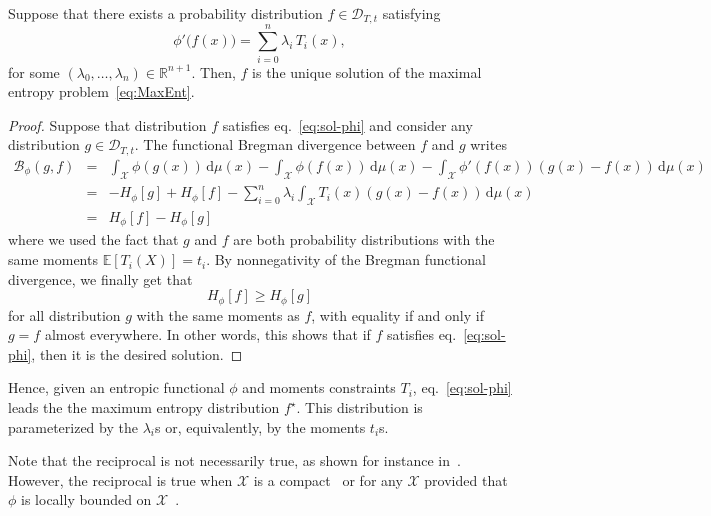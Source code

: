 \documentclass[entropy,article,submit,moreauthors,pdftex]{Definitions/mdpi}
\def\dmu{\mathrm{d}\mu}%
\def\fB{\mathcal{B}}%
\def\Rset{\mathbb{R}}%
\def\X{\mathcal{X}}%
\def\D{\mathcal{D}}%
\newcommand{\Esp}[1]{\mathbb{E}\left[ #1 \right]}%
\begin{document}
\begin{Proposition}
\label{prop:sol-phi}
%
  Suppose  that  there  exists  a  probability  distribution  $f  \in  \D_{T,t}$
  satisfying
  \begin{equation}\label{eq:sol-phi}
  \phi'\big(f(x)\big) = \sum_{i=0}^n \lambda_i \, T_i(x),
  \end{equation}
  for  some $(\lambda_0,\ldots,\lambda_n)  \in \Rset^{n+1}$.   Then, $f$  is the
  unique solution of the maximal entropy problem~\eqref{eq:MaxEnt}.
\end{Proposition}
%
\begin{proof}
  Suppose that  distribution $f$  satisfies eq.~\eqref{eq:sol-phi}  and consider
  any distribution $g \in \D_{T,t}$.   The functional Bregman divergence between
  $f$ and $g$ writes
  \begin{eqnarray*}
  \fB_\phi(g,f) & = & \int_\X \phi(g(x)) \, \dmu(x) - \int_\X \phi(f(x)) \,
  \dmu(x) - \int_\X \phi'(f(x)) \left( g(x) - f(x) \right) \, \dmu(x)
  \\[2mm]
  & = & - H_\phi[g] + H_\phi[f] - \sum_{i=0}^n \lambda_i \int_\X T_i(x) \left(
  g(x) - f(x) \right) \, \dmu(x)
  \\[2mm]
  & = & H_\phi[f] - H_\phi[g]
  \end{eqnarray*}
  where we  used the fact  that $g$ and  $f$ are both  probability distributions
  with the same  moments $\Esp{T_i(X)} = t_i$.  By nonnegativity  of the Bregman
  functional divergence, we finally get that
  \[
  H_\phi[f] \ge H_\phi[g]
  \]
  for all distribution  $g$ with the same  moments as $f$, with  equality if and
  only if  $g = f$ almost  everywhere.  In other  words, this shows that  if $f$
  satisfies eq.~\eqref{eq:sol-phi}, then it is the desired solution.
\end{proof}

Hence,  given  an entropic  functional  $\phi$  and moments  constraints  $T_i$,
eq.~\eqref{eq:sol-phi}  leads the  the maximum  entropy distribution  $f^\star$.
This distribution is parameterized by  the $\lambda_i$s or, equivalently, by the
moments $t_i$s.

Note  that  the reciprocal  is  not  necessarily  true,  as shown  for  instance
in~\cite{BorLew93}.   However,   the  reciprocal   is  true   when  $\X$   is  a
compact~\cite{Gir97} or for any $\X$ provided  that $\phi$ is locally bounded on
$\X$~\cite{Gir07}.
\end{document}
